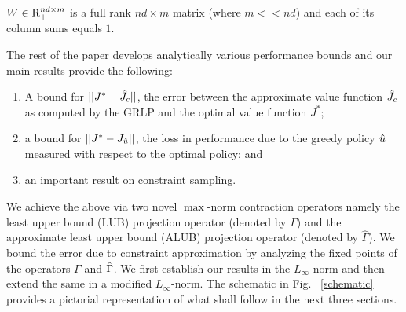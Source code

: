 \begin{assumption}\label{wassump}
$W \in \mathrm{R}^{nd\times m}_+$ is a full rank $nd\times m$  matrix (where $m<<nd$) and each of its column sums equals $1$.
\end{assumption}
\begin{comment}
The above assumption is just a technical condition that eliminates uninteresting choices such as $W=0$ or cases when certain columns of $W$ have all zeros, which implies that the corresponding column generates no constraint.
\end{comment}

The rest of the paper develops analytically various performance bounds and our main results provide the following:
\begin{enumerate}
\item A bound for $||J^*-\hat{J}_c||$, the error between the approximate value function $\hat{J}_c$ as computed by the GRLP and the optimal value function $J^*$;
\item a bound for $||J^*-J_{\hat{u}}||$, the loss in performance due to the greedy policy $\hat{u}$ measured with respect to the optimal policy; and
\item an important result on constraint sampling.
\end{enumerate}
We achieve the above via two novel $\max$-norm contraction operators namely the least upper bound (LUB) projection operator (denoted by $\Gamma$) and the approximate least upper bound (ALUB) projection operator (denoted by $\hat{\Gamma}$). We bound the error due to constraint approximation by analyzing the fixed points of the operators $\Gamma$ and $\hat{\Gamma}$. We first establish our results in the $L_\infty$-norm and then extend the same in a modified $L_\infty$-norm. The schematic in Fig. ~\ref{schematic} provides a pictorial representation of what shall follow in the next three sections.
\FloatBarrier


